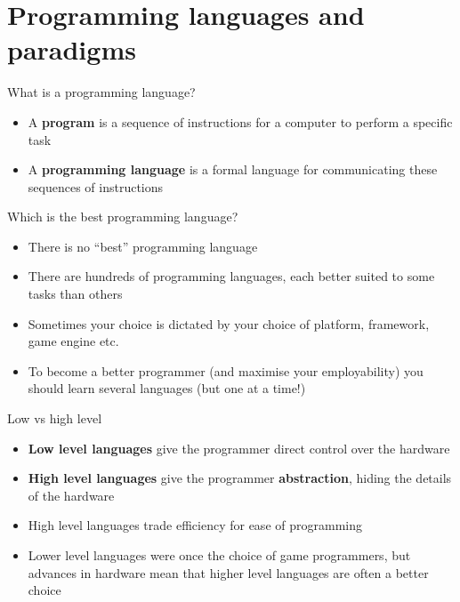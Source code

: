 \part{Programming languages and paradigms}
\frame{\partpage}

\begin{frame}{What is a programming language?}
	\begin{itemize}
		\pause\item A \textbf{program} is a sequence of instructions for a computer to perform a specific task
		\pause\item A \textbf{programming language} is a formal language for communicating these sequences of instructions
	\end{itemize}
\end{frame}

\begin{frame}{Which is the best programming language?}
	\begin{itemize}
		\pause\item There is no ``best'' programming language
		\pause\item There are hundreds of programming languages, each better suited to some tasks than others
		\pause\item Sometimes your choice is dictated by your choice of platform, framework, game engine etc.
		\pause\item To become a better programmer (and maximise your employability)
			you should learn several languages (but one at a time!)
	\end{itemize}
\end{frame}

\begin{frame}{Low vs high level}
	\begin{itemize}
		\pause\item \textbf{Low level languages} give the programmer direct control over
			the hardware
		\pause\item \textbf{High level languages} give the programmer \textbf{abstraction},
			hiding the details of the hardware
		\pause\item High level languages trade efficiency for ease of programming
		\pause\item Lower level languages were once the choice of game programmers,
			but advances in hardware mean that higher level languages are often a
			better choice
	\end{itemize}
\end{frame}

